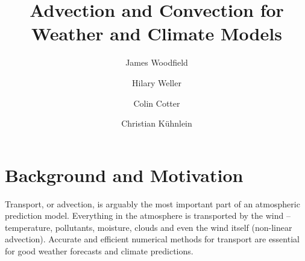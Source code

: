 



\title{Advection and Convection for Weather and Climate Models}

\author[1]{James Woodfield}

\author[2]{Hilary Weller}

\author[3]{Colin Cotter}


\author[4]{Christian K\"uhnlein}

\maketitle

\section{Background and Motivation}

Transport, or advection, is arguably the most important part of an atmospheric prediction model. Everything in the atmosphere is transported by the wind -- temperature, pollutants, moisture, clouds and even the wind itself (non-linear advection). Accurate and efficient numerical methods for transport are essential for good weather forecasts and climate predictions.

